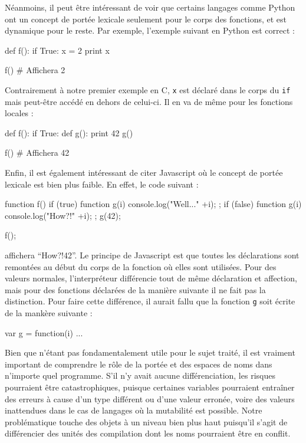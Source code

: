 \documentclass[11pt,a4paper]{report}
\begin{document}
Néanmoins, il peut être intéressant de voir que certains langages comme Python
\cite{python-spec} ont un concept de portée lexicale seulement pour le corps des
fonctions, et est dynamique pour le reste. Par exemple, l'exemple suivant en
Python est correct :
\begin{Python}
def f(): 
    if True:
        x = 2
    print x

f() # Affichera 2
\end{Python}
Contrairement à notre premier exemple en C, \texttt{x} est déclaré dans le corps
du \texttt{if} mais peut-être accédé en dehors de celui-ci. Il en va de même
pour les fonctions locales :
\begin{Python}
def f():
    if True:
        def g():
            print 42
    g()

f() # Affichera 42
\end{Python}

Enfin, il est également intéressant de citer Javascript où le concept de portée
lexicale est bien plus faible. En effet, le code suivant :
\begin{JS}
function f() {
  if (true) {
    function g(i) {
      console.log("Well..." +i);
    };
  }
  if (false) {
    function g(i) {
      console.log("How?!" +i);
    };
  }
  g(42);
}

f();
\end{JS}
affichera ``How?!42''. Le principe de Javascript est que toutes les déclarations
sont remontées au début du corps de la fonction où elles sont utilisées. Pour
des valeurs normales, l'interpréteur différencie tout de même déclaration et
affection, mais pour des fonctions déclarées de la manière suivante il ne fait
pas la distinction. Pour faire cette différence, il aurait fallu que la fonction
\texttt{g} soit écrite de la mankère suivante : 
\begin{JS}
var g = function(i) { ... }
\end{JS}

Bien que n'étant pas fondamentalement utile pour le sujet traité, il est
vraiment important de comprendre le rôle de la portée et des espaces de noms
dans n'importe quel programme. S'il n'y avait aucune différenciation, les
risques pourraient être catastrophiques, puisque certaines variables pourraient
entraîner des erreurs à cause d'un type différent ou d'une valeur erronée, voire
des valeurs inattendues dans le cas de langages où la mutabilité est
possible. Notre problématique touche des objets à un niveau bien plus haut
puisqu'il s'agit de différencier des unités des compilation dont les noms
pourraient être en conflit.
\end{document}
